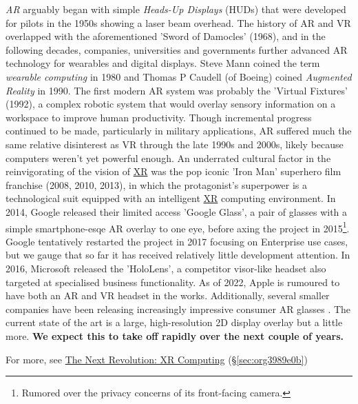 \documentclass[logo,bsc,singlespacing,parskip]{infthesis}
\begin{document}
\emph{AR} arguably began with simple \emph{Heads-Up Displays} (HUDs) that were developed for pilots in the 1950s showing a laser beam overhead.
The history of AR and VR overlapped with the aforementioned 'Sword of Damocles' (1968), and in the following decades, companies, universities and governments further advanced AR technology for wearables and digital displays.
Steve Mann coined the term \emph{wearable computing} in 1980 and Thomas P Caudell (of Boeing) coined \emph{Augmented Reality} in 1990.
The first modern AR system was probably the 'Virtual Fixtures' (1992), a complex robotic system that would overlay sensory information on a workspace to improve human productivity.
Though incremental progress continued to be made, particularly in military applications, AR suffered much the same relative disinterest as VR through the late 1990s and 2000s, likely because computers weren't yet powerful enough.
An underrated cultural factor in the reinvigorating of the vision of \hyperref[orgf7f8e78]{XR} was the pop iconic 'Iron Man' superhero film franchise (2008, 2010, 2013),  in which the protagonist's superpower is a technological suit equipped with an intelligent \hyperref[orgf7f8e78]{XR} computing environment.
In 2014, Google released their limited access 'Google Glass', a pair of glasses with a simple smartphone-esqe AR overlay to one eye, before axing the project in 2015\footnote{Rumored over the privacy concerns of its front-facing camera.}.
Google tentatively restarted the project in 2017 focusing on Enterprise use cases, but we gauge that so far it has received relatively little development attention.
In 2016, Microsoft released the 'HoloLens', a competitor visor-like headset also targeted at specialised business functionality.
As of 2022, Apple is rumoured to have both an AR and VR headset in the works.
Additionally, several smaller companies have been releasing increasingly impressive consumer AR glasses \autocites{NrealAir}[][]{INMOAIRWorld}[][]{VuzixBladeUpgraded}.
The current state of the art is a large, high-resolution 2D display overlay but a little more.
\textbf{We expect this to take off rapidly over the next couple of years.}

For more, see \hyperref[sec:org3989e0b]{The Next Revolution: XR Computing} (\S \ref{sec:org3989e0b})
\end{document}
